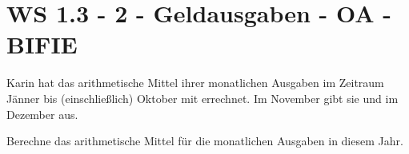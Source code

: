 \section{WS 1.3 - 2 - Geldausgaben - OA - BIFIE}

\begin{beispiel}[WS 1.3]{1} %
Karin hat das arithmetische Mittel ihrer monatlichen Ausgaben im Zeitraum Jänner bis (einschließlich) Oktober mit  errechnet. Im November gibt sie  und im Dezember  aus.

Berechne das arithmetische Mittel für die monatlichen Ausgaben in diesem Jahr.
\\

\end{beispiel}